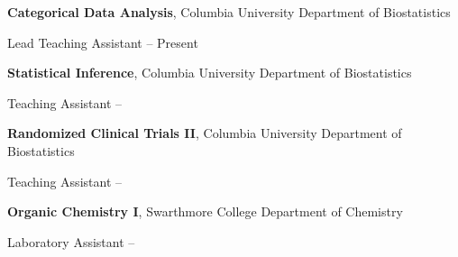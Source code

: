 \documentclass[a4paper,10pt,oneside]{article}
\begin{document}
\begin{body}
\textbf{Categorical Data Analysis},
Columbia University Department of Biostatistics
\par
Lead Teaching Assistant
\hfill
{} --
Present

\EntryGap
\textbf{Statistical Inference},
Columbia University Department of Biostatistics
\par
Teaching Assistant
\hfill
{} --

\EntryGap
\textbf{Randomized Clinical Trials II},
Columbia University Department of Biostatistics
\par
Teaching Assistant
\hfill
{} --

\EntryGap
\textbf{Organic Chemistry I},
Swarthmore College Department of Chemistry
\par
Laboratory Assistant
\hfill
{} --

\end{body}
\label{LastPage}~
\end{document}
